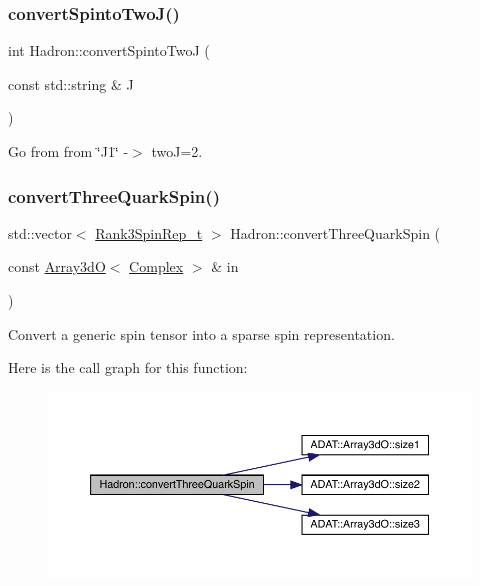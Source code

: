 \subsubsection{\texorpdfstring{convertSpintoTwoJ()}{convertSpintoTwoJ()}}
{\footnotesize\ttfamily int Hadron\+::convert\+Spinto\+TwoJ (\begin{DoxyParamCaption}\item[{const std\+::string \&}]{J }\end{DoxyParamCaption})}



Go from from \char`\"{}\+J1\char`\"{} -\/$>$ twoJ=2. 

\mbox{\label{namespaceHadron_abbb775633773ccb52dcaef4974305df9}} 
\subsubsection{\texorpdfstring{convertThreeQuarkSpin()}{convertThreeQuarkSpin()}}
{\footnotesize\ttfamily std\+::vector$<$ \mbox{\hyperlink{structHadron_1_1Rank3SpinRep__t}{Rank3\+Spin\+Rep\+\_\+t}} $>$ Hadron\+::convert\+Three\+Quark\+Spin (\begin{DoxyParamCaption}\item[{const \mbox{\hyperlink{classADAT_1_1Array3dO}{Array3dO}}$<$ \mbox{\hyperlink{group__defs_gabaa4aa11d5212d34042d08bf0b2f9cc0}{Complex}} $>$ \&}]{in }\end{DoxyParamCaption})}



Convert a generic spin tensor into a sparse spin representation. 

Here is the call graph for this function\+:
\nopagebreak
\begin{figure}[H]
\begin{center}
\leavevmode
\includegraphics[width=350pt]{d1/daf/namespaceHadron_abbb775633773ccb52dcaef4974305df9_cgraph}
\end{center}
\end{figure}
\mbox{\label{namespaceHadron_a354d39c9f601a0a0f19857eb4b79a2d2}} 
